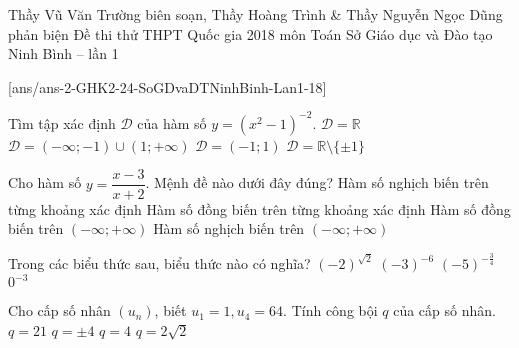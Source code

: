 \begin{name}
{Thầy Vũ Văn Trường biên soạn, Thầy Hoàng Trình \& Thầy Nguyễn Ngọc Dũng phản biện}
{Đề thi thử THPT Quốc gia 2018 môn Toán Sở Giáo dục và Đào tạo Ninh Bình – lần 1}
\end{name}

\setcounter{ex}{0}
[ans/ans-2-GHK2-24-SoGDvaDTNinhBinh-Lan1-18]
\begin{ex}%
Tìm tập xác định $\mathscr{D}$ của hàm số $y=\left(x^2-1\right)^{-2}$.
\choice
{$\mathscr{D}=\mathbb{R}$}
{$\mathscr{D}=(-\infty;-1)\cup (1;+\infty)$}
{$\mathscr{D}=(-1;1)$}
{\True$\mathscr{D}=\mathbb{R}\setminus \{\pm 1\}$}
\end{ex}
\begin{ex}%
Cho hàm số $y=\dfrac{x-3}{x+2}$. Mệnh đề nào dưới đây đúng?
\choice
{Hàm số nghịch biến trên từng khoảng xác định}
{\True Hàm số đồng biến trên từng khoảng xác định}
{Hàm số đồng biến trên $(-\infty;+\infty)$}
{Hàm số nghịch biến trên $(-\infty;+\infty)$}
\end{ex}
\begin{ex}%
Trong các biểu thức sau, biểu thức nào có nghĩa?
\choice
{$\left(-2\right)^{\sqrt{2}}$}
{\True$\left(-3\right)^{-6}$}
{$\left(-5\right)^{-\frac{3}{4}}$}
{$0^{-3}$	}
\end{ex}
\begin{ex}%
Cho cấp số nhân $\left(u_n\right)$, biết $u_1=1, u_4=64$. Tính công bội $q$ của cấp số nhân.
\choice
{$q=21$}
{$q=\pm 4$}
{\True$q=4$}
{$q=2\sqrt{2}$}
\end{ex}
